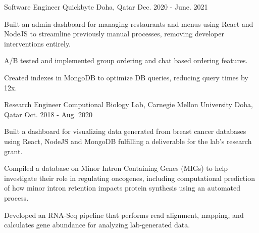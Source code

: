 \begin{cventries}
  \cventry
    {Software Engineer} %
    {Quickbyte} %
    {Doha, Qatar} %
    {Dec. 2020 - June. 2021} %
    {
      \begin{cvitems} %
        \item {Built an admin dashboard for managing restaurants and menus using React and NodeJS to streamline previously manual processes, removing developer interventions entirely.}
        \item {A/B tested and implemented group ordering and chat based ordering features.}
        \item {Created indexes in MongoDB to optimize DB queries, reducing query times by 12x.}
      \end{cvitems}
    }

  \cventry
    {Research Engineer} %
    {Computional Biology Lab, Carnegie Mellon University} %
    {Doha, Qatar} %
    {Oct. 2018 - Aug. 2020} %
    {
      \begin{cvitems} %
        \item {Built a dashboard for visualizing data generated from breast cancer databases using React, NodeJS and MongoDB fulfilling a deliverable for the lab's research grant.}
        \item {Compiled a database on Minor Intron Containing Genes (MIGs) to help investigate their role in regulating oncogenes, including computational prediction of how minor intron retention impacts protein synthesis using an automated process.}
        \item {Developed an RNA-Seq pipeline that performs read alignment, mapping, and calculates gene abundance for analyzing lab-generated data.}
      \end{cvitems}
    }

\end{cventries}
